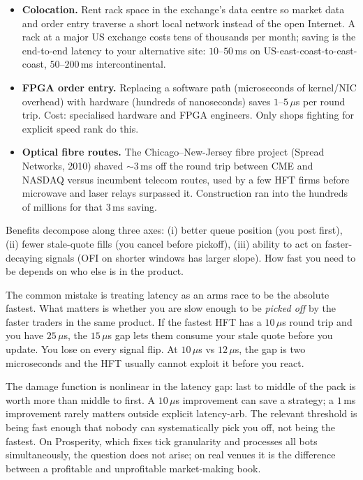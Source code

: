 \begin{itemize}
  \item \textbf{Colocation.} Rent rack space in the exchange's
  data centre so market data and order entry traverse a short
  local network instead of the open Internet. A rack at a major
  US exchange costs tens of thousands per month; saving is the
  end-to-end latency to your alternative site: $10$--$50$\,ms on
  US-east-coast-to-east-coast, $50$--$200$\,ms intercontinental.
  \item \textbf{FPGA order entry.} Replacing a software path
  (microseconds of kernel/NIC overhead) with hardware (hundreds
  of nanoseconds) saves $1$--$5\,\mu$s per round trip. Cost:
  specialised hardware and FPGA engineers. Only shops fighting
  for explicit speed rank do this.
  \item \textbf{Optical fibre routes.} The Chicago--New-Jersey
  fibre project (Spread Networks, 2010) shaved $\sim 3$\,ms off
  the round trip between CME and NASDAQ versus incumbent telecom
  routes, used by a few HFT firms before microwave and laser
  relays surpassed it. Construction ran into the hundreds of
  millions for that $3$\,ms saving.
\end{itemize}

Benefits decompose along three axes: (i) better queue position
(you post first), (ii) fewer stale-quote fills (you cancel
before pickoff), (iii) ability to act on faster-decaying signals
(OFI on shorter windows has larger slope). How fast you need to
be depends on who else is in the product.

\begin{pitfallbox}
The common mistake is treating latency as an arms race to be
the absolute fastest. What matters is whether you are slow
enough to be \emph{picked off} by the faster traders in the
same product. If the fastest HFT has a $10\,\mu$s round trip
and you have $25\,\mu$s, the $15\,\mu$s gap lets them consume
your stale quote before you update. You lose on every signal
flip. At $10\,\mu$s vs $12\,\mu$s, the gap is two microseconds
and the HFT usually cannot exploit it before you react.

The damage function is nonlinear in the latency gap: last to
middle of the pack is worth more than middle to first. A
$10\,\mu$s improvement can save a strategy; a $1$\,ms
improvement rarely matters outside explicit latency-arb.
The relevant threshold is being fast enough that nobody can
systematically pick you off, not being the fastest. On
Prosperity, which fixes tick granularity and processes all bots
simultaneously, the question does not arise; on real venues it
is the difference between a profitable and unprofitable
market-making book.
\end{pitfallbox}

